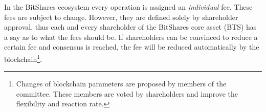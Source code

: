 \label{sec:dexfee}

In the BitShares ecosystem every operation is assigned an \emph{individual}
fee. These fees are subject to change. However, they are defined solely by
shareholder approval, thus each and every shareholder of the BitShares core
asset (BTS) has a say as to what the fees should be. If shareholders can be
convinced to reduce a certain fee and consensus is reached, the fee will be
reduced automatically by the blockchain\footnote{Changes of blockchain
parameters are proposed by members of the committee. These members are voted by
shareholders and improve the flexibility and reaction rate.}.


